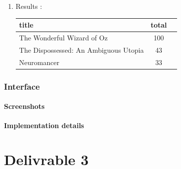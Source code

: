 \documentclass[doubleside, titlepage]{article}
\begin{document}
\begin{enumerate}
\begin{enumerate}
	\item Results :\\

	\begin{tabular}{|l|c|r|}
	  \hline
		title & total\\
	  \hline
		The Wonderful Wizard of Oz	& 100\\
		The Dispossessed: An Ambiguous Utopia	& 43\\
		Neuromancer	& 33\\
	  \hline
	\end{tabular}
\end{enumerate}

\end{enumerate}

\section{Interface}

\subsection{Screenshots}

\subsection{Implementation details}

\newpage
\part{Delivrable 3}
\end{document}
